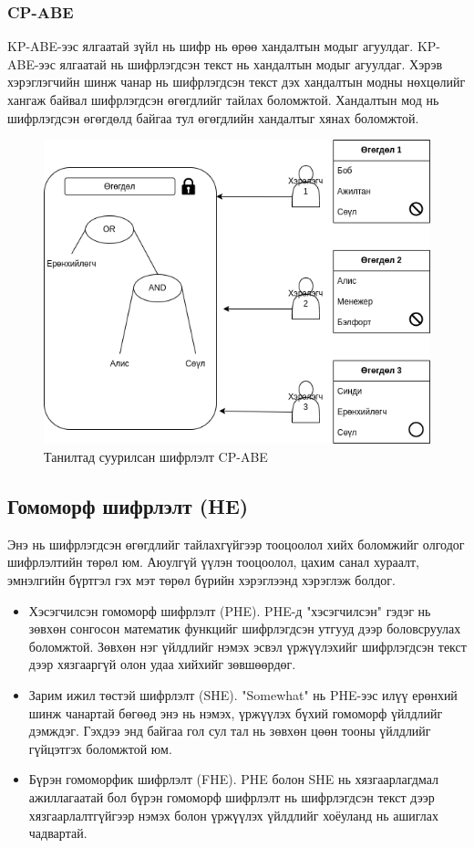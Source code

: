 \subsubsection*{CP-ABE}
KP-ABE-ээс ялгаатай зүйл нь шифр нь өрөө хандалтын модыг агуулдаг. KP-ABE-ээс ялгаатай нь шифрлэгдсэн текст нь хандалтын модыг агуулдаг. Хэрэв хэрэглэгчийн шинж чанар нь шифрлэгдсэн текст дэх хандалтын модны нөхцөлийг хангаж байвал шифрлэгдсэн өгөгдлийг тайлах боломжтой. Хандалтын мод нь шифрлэгдсэн өгөгдөлд байгаа тул өгөгдлийн хандалтыг хянах боломжтой.
\begin{figure}[ht]
    \centering
    \includegraphics[scale=0.6]{Figures/encryption_schemes/cp-abe.drawio.png}
    \caption{Танилтад суурилсан шифрлэлт CP-ABE}
    \label{fig:cp-abe}
\end{figure}

\subsection*{Гомоморф шифрлэлт (HE)}
Энэ нь шифрлэгдсэн өгөгдлийг тайлахгүйгээр тооцоолол хийх боломжийг олгодог шифрлэлтийн төрөл юм. Аюулгүй үүлэн тооцоолол, цахим санал хураалт, эмнэлгийн бүртгэл гэх мэт төрөл бүрийн хэрэглээнд хэрэглэж болдог.\cite{WikiHE}

\begin{itemize}
    \item Хэсэгчилсэн гомоморф шифрлэлт (PHE). PHE-д "хэсэгчилсэн" гэдэг нь зөвхөн сонгосон математик функцийг шифрлэгдсэн утгууд дээр боловсруулах боломжтой. Зөвхөн нэг үйлдлийг нэмэх эсвэл үржүүлэхийг шифрлэгдсэн текст дээр хязгааргүй олон удаа хийхийг зөвшөөрдөг.
    \item Зарим ижил төстэй шифрлэлт (SHE). "Somewhat" нь PHE-ээс илүү ерөнхий шинж чанартай бөгөөд энэ нь нэмэх, үржүүлэх бүхий гомоморф үйлдлийг дэмждэг. Гэхдээ энд байгаа гол сул тал нь зөвхөн цөөн тооны үйлдлийг гүйцэтгэх боломжтой юм.
    \item Бүрэн гомоморфик шифрлэлт (FHE). PHE болон SHE нь хязгаарлагдмал ажиллагаатай бол бүрэн гомоморф шифрлэлт нь шифрлэгдсэн текст дээр хязгаарлалтгүйгээр нэмэх болон үржүүлэх үйлдлийг хоёуланд нь ашиглах чадвартай.
\end{itemize}

